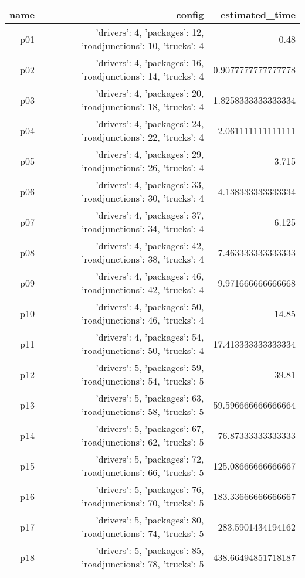 \documentclass{article}
\begin{document}
                            \begin{center}
                            \scriptsize
                            \begin{tabular}{r|r|r}
                            name & config & estimated\_time\\\midrule
                              p01&{'drivers': 4, 'packages': 12, 'roadjunctions': 10, 'trucks': 4}&0.48\\
  p02&{'drivers': 4, 'packages': 16, 'roadjunctions': 14, 'trucks': 4}&0.9077777777777778\\
  p03&{'drivers': 4, 'packages': 20, 'roadjunctions': 18, 'trucks': 4}&1.8258333333333334\\
  p04&{'drivers': 4, 'packages': 24, 'roadjunctions': 22, 'trucks': 4}&2.061111111111111\\
  p05&{'drivers': 4, 'packages': 29, 'roadjunctions': 26, 'trucks': 4}&3.715\\
  p06&{'drivers': 4, 'packages': 33, 'roadjunctions': 30, 'trucks': 4}&4.138333333333334\\
  p07&{'drivers': 4, 'packages': 37, 'roadjunctions': 34, 'trucks': 4}&6.125\\
  p08&{'drivers': 4, 'packages': 42, 'roadjunctions': 38, 'trucks': 4}&7.463333333333333\\
  p09&{'drivers': 4, 'packages': 46, 'roadjunctions': 42, 'trucks': 4}&9.971666666666668\\
  p10&{'drivers': 4, 'packages': 50, 'roadjunctions': 46, 'trucks': 4}&14.85\\
  p11&{'drivers': 4, 'packages': 54, 'roadjunctions': 50, 'trucks': 4}&17.413333333333334\\
  p12&{'drivers': 5, 'packages': 59, 'roadjunctions': 54, 'trucks': 5}&39.81\\
  p13&{'drivers': 5, 'packages': 63, 'roadjunctions': 58, 'trucks': 5}&59.596666666666664\\
  p14&{'drivers': 5, 'packages': 67, 'roadjunctions': 62, 'trucks': 5}&76.87333333333333\\
  p15&{'drivers': 5, 'packages': 72, 'roadjunctions': 66, 'trucks': 5}&125.08666666666667\\
  p16&{'drivers': 5, 'packages': 76, 'roadjunctions': 70, 'trucks': 5}&183.33666666666667\\
  p17&{'drivers': 5, 'packages': 80, 'roadjunctions': 74, 'trucks': 5}&283.5901434194162\\
  p18&{'drivers': 5, 'packages': 85, 'roadjunctions': 78, 'trucks': 5}&438.66494851718187\\

\end{tabular}
\end{center}
\end{document}

